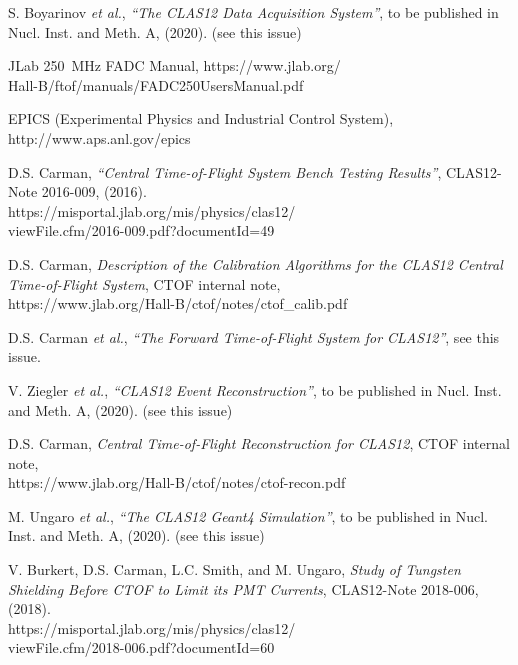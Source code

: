 \documentclass[3p,times,twocolumn]{elsarticle}
\begin{document}
\begin{thebibliography}{99}
S. Boyarinov {\it et al.}, {\it ``The CLAS12 Data Acquisition System''}, to be published in Nucl. Inst.
and Meth. A, (2020). (see this issue)
  
JLab 250~MHz FADC Manual, https://www.jlab.org/\\ Hall-B/ftof/manuals/FADC250UsersManual.pdf
  
EPICS (Experimental Physics and Industrial Control System), http://www.aps.anl.gov/epics

D.S. Carman, {\it ``Central Time-of-Flight System Bench Testing Results''},
CLAS12-Note 2016-009, (2016).\\
https://misportal.jlab.org/mis/physics/clas12/\\ viewFile.cfm/2016-009.pdf?documentId=49

D.S. Carman, {\it Description of the Calibration Algorithms for the CLAS12 Central Time-of-Flight System},
CTOF internal note, \\
https://www.jlab.org/Hall-B/ctof/notes/ctof\_calib.pdf

D.S. Carman {\it et al.}, {\it ``The Forward Time-of-Flight System for CLAS12''}, see this issue.

V. Ziegler {\it et al.}, {\it ``CLAS12 Event Reconstruction''}, to be published in Nucl. Inst.
and Meth. A, (2020). (see this issue)
  
D.S. Carman, {\it Central Time-of-Flight Reconstruction for CLAS12}, CTOF internal note, \\
https://www.jlab.org/Hall-B/ctof/notes/ctof-recon.pdf

M. Ungaro {\it et al.}, {\it ``The CLAS12 Geant4 Simulation''}, to be published in Nucl. Inst.
and Meth. A, (2020). (see this issue)
  
V. Burkert, D.S. Carman, L.C. Smith, and M. Ungaro, {\it Study of Tungsten Shielding Before CTOF to Limit
its PMT Currents}, CLAS12-Note 2018-006, (2018).\\
https://misportal.jlab.org/mis/physics/clas12/\\ viewFile.cfm/2018-006.pdf?documentId=60

\end{thebibliography}
\end{document}
